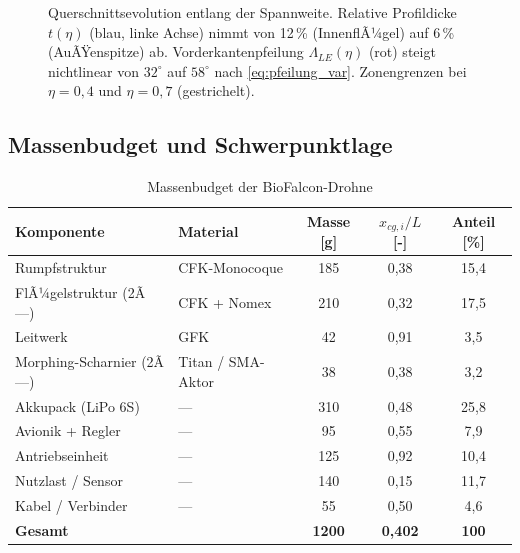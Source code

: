 ﻿\documentclass[12pt,a4paper]{article}
\theoremstyle{remark}
\begin{document}
\begin{figure}[H]
		\caption{Querschnittsevolution entlang der Spannweite. Relative Profildicke $t(\eta)$
			(blau, linke Achse) nimmt von 12\,\% (InnenflÃ¼gel) auf 6\,\% (AuÃŸenspitze) ab.
			Vorderkantenpfeilung $\Lambda_{LE}(\eta)$ (rot) steigt nichtlinear von $32^{\circ}$
			auf $58^{\circ}$ nach \cref{eq:pfeilung_var}. Zonengrenzen bei $\eta=0{,}4$ und
			$\eta=0{,}7$ (gestrichelt).}
		\label{fig:querschnitt_evolution}
	\end{figure}
	
	\subsection{Massenbudget und Schwerpunktlage}
	\label{sec:masse}
	
	\begin{table}[H]
		\centering
		\caption{Massenbudget der BioFalcon-Drohne}
		\label{tab:masse}
		\begin{tabular}{llccc}
			\toprule
			\textbf{Komponente} & \textbf{Material} &
			\textbf{Masse [g]} & \textbf{$x_{cg,i}/L$ [-]} &
			\textbf{Anteil [\%]} \\
			\midrule
			Rumpfstruktur          & CFK-Monocoque      & 185 & 0{,}38 & 15{,}4 \\
			FlÃ¼gelstruktur (2Ã—)    & CFK + Nomex        & 210 & 0{,}32 & 17{,}5 \\
			Leitwerk               & GFK                &  42 & 0{,}91 &  3{,}5 \\
			Morphing-Scharnier (2Ã—)& Titan / SMA-Aktor  &  38 & 0{,}38 &  3{,}2 \\
			Akkupack (LiPo 6S)     & ---                & 310 & 0{,}48 & 25{,}8 \\
			Avionik + Regler       & ---                &  95 & 0{,}55 &  7{,}9 \\
			Antriebseinheit        & ---                & 125 & 0{,}92 & 10{,}4 \\
			Nutzlast / Sensor      & ---                & 140 & 0{,}15 & 11{,}7 \\
			Kabel / Verbinder      & ---                &  55 & 0{,}50 &  4{,}6 \\
			\midrule
			\textbf{Gesamt}        &                    & \textbf{1200} &
			\textbf{0{,}402} & \textbf{100} \\
			\bottomrule
		\end{tabular}
	\end{table}
	
\end{document}
